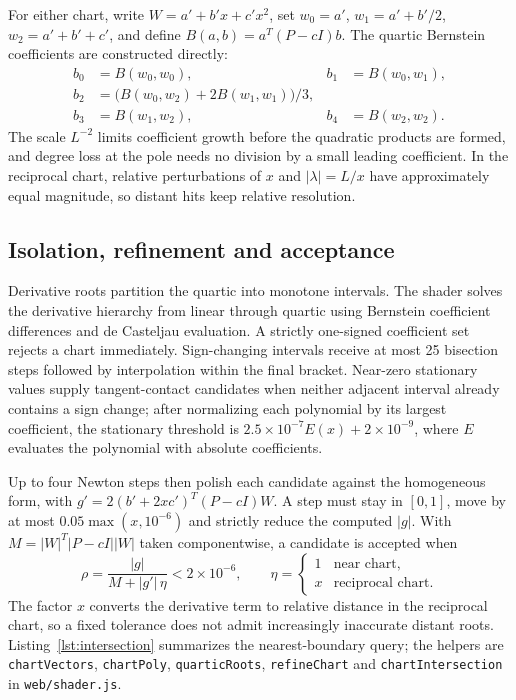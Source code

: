 \documentclass{jcgt}
\providecommand{\passthrough}[1]{#1}
\begin{document}
For either chart, write \(W=a'+b'x+c'x^2\), set \(w_0=a'\),
\(w_1=a'+b'/2\), \(w_2=a'+b'+c'\), and define \(B(a,b)=a^T(P-cI)b\). The
quartic Bernstein coefficients are constructed directly: \[
\begin{aligned}
b_0&=B(w_0,w_0), & b_1&=B(w_0,w_1),\\
b_2&=\bigl(B(w_0,w_2)+2B(w_1,w_1)\bigr)/3,\\
b_3&=B(w_1,w_2), & b_4&=B(w_2,w_2).
\end{aligned}
\] The scale \(L^{-2}\) limits coefficient growth before the quadratic
products are formed, and degree loss at the pole needs no division by a
small leading coefficient. In the reciprocal chart, relative
perturbations of \(x\) and \(|\lambda|=L/x\) have approximately equal
magnitude, so distant hits keep relative resolution.

\subsection{Isolation, refinement and
acceptance}\label{isolation-refinement-and-acceptance}

Derivative roots partition the quartic into monotone intervals. The
shader solves the derivative hierarchy from linear through quartic using
Bernstein coefficient differences and de Casteljau evaluation. A
strictly one-signed coefficient set rejects a chart immediately.
Sign-changing intervals receive at most 25 bisection steps followed by
interpolation within the final bracket. Near-zero stationary values
supply tangent-contact candidates when neither adjacent interval already
contains a sign change; after normalizing each polynomial by its largest
coefficient, the stationary threshold is
\(2.5\times10^{-7}E(x)+2\times10^{-9}\), where \(E\) evaluates the
polynomial with absolute coefficients.

Up to four Newton steps then polish each candidate against the
homogeneous form, with \(g'=2(b'+2xc')^T(P-cI)W\). A step must stay in
\([0,1]\), move by at most \(0.05\max(x,10^{-6})\) and strictly reduce
the computed \(|g|\). With \(M=|W|^T|P-cI||W|\) taken componentwise, a
candidate is accepted when \[
\rho=\frac{|g|}{M+|g'|\,\eta}<2\times10^{-6},\qquad
\eta=\begin{cases}1&\text{near chart},\\x&\text{reciprocal chart}.\end{cases}
\] The factor \(x\) converts the derivative term to relative distance in
the reciprocal chart, so a fixed tolerance does not admit increasingly
inaccurate distant roots. Listing~\ref{lst:intersection} summarizes the nearest-boundary
query; the helpers are \passthrough{\lstinline!chartVectors!},
\passthrough{\lstinline!chartPoly!},
\passthrough{\lstinline!quarticRoots!},
\passthrough{\lstinline!refineChart!} and
\passthrough{\lstinline!chartIntersection!} in
\passthrough{\lstinline!web/shader.js!}.
\end{document}
